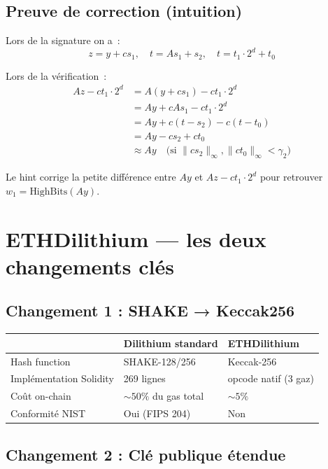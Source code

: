 \documentclass[12pt, a4paper]{article}
\begin{document}
\subsection{Preuve de correction (intuition)}

Lors de la signature on a~:
$$z = y + cs_1, \quad t = As_1 + s_2, \quad t = t_1 \cdot 2^d + t_0$$

Lors de la vérification~:
\begin{align*}
Az - ct_1 \cdot 2^d
&= A(y + cs_1) - ct_1 \cdot 2^d \\
&= Ay + cAs_1 - ct_1 \cdot 2^d \\
&= Ay + c(t - s_2) - c(t - t_0) \\
&= Ay - cs_2 + ct_0 \\
&\approx Ay \quad \text{(si } \|cs_2\|_\infty, \|ct_0\|_\infty < \gamma_2\text{)}
\end{align*}

Le hint corrige la petite différence entre $Ay$ et $Az - ct_1 \cdot 2^d$
pour retrouver $w_1 = \text{HighBits}(Ay)$.

\section{ETHDilithium --- les deux changements clés}

\subsection{Changement 1 : SHAKE → Keccak256}

\begin{center}
\begin{tabular}{lll}
\toprule
& \textbf{Dilithium standard} & \textbf{ETHDilithium} \\
\midrule
Hash function & SHAKE-128/256 & Keccak-256 \\
Implémentation Solidity & 269 lignes & opcode natif (3 gaz) \\
Coût on-chain & $\sim 50\%$ du gas total & $\sim 5\%$ \\
Conformité NIST & Oui (FIPS 204) & Non \\
\bottomrule
\end{tabular}
\end{center}

\subsection{Changement 2 : Clé publique étendue}
\end{document}
